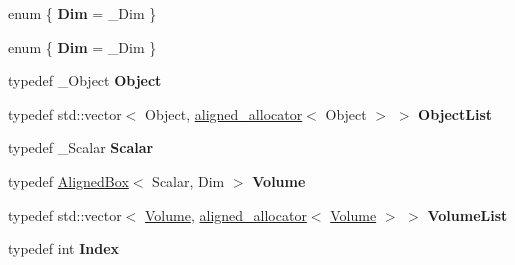 \begin{DoxyCompactItemize}
\item 
\mbox{\label{class_eigen_1_1_kd_b_v_h_a1f3066a8ca1cd3418752529af78ed202}} 
enum \{ {\bfseries Dim} = \+\_\+\+Dim
 \}
\item 
\mbox{\label{class_eigen_1_1_kd_b_v_h_a714c02ec57b42170e025e4790cb52114}} 
enum \{ {\bfseries Dim} = \+\_\+\+Dim
 \}
\item 
\mbox{\label{class_eigen_1_1_kd_b_v_h_a5e7aa76dd924d1769a6553e01ad15465}} 
typedef \+\_\+\+Object {\bfseries Object}
\item 
\mbox{\label{class_eigen_1_1_kd_b_v_h_ae4959ded9043c983256243c96a70729b}} 
typedef std\+::vector$<$ Object, \hyperlink{group___core___module_class_eigen_1_1aligned__allocator}{aligned\+\_\+allocator}$<$ Object $>$ $>$ {\bfseries Object\+List}
\item 
\mbox{\label{class_eigen_1_1_kd_b_v_h_a9d6a9f44ab06e4de7710a16ddbf57d4d}} 
typedef \+\_\+\+Scalar {\bfseries Scalar}
\item 
\mbox{\label{class_eigen_1_1_kd_b_v_h_aa6dc4b3d16e0af79823b21ee3cd53c93}} 
typedef \hyperlink{group___geometry___module_class_eigen_1_1_aligned_box}{Aligned\+Box}$<$ Scalar, Dim $>$ {\bfseries Volume}
\item 
\mbox{\label{class_eigen_1_1_kd_b_v_h_a7dfb6a468c70f7e1a0a4e24303bdfb8a}} 
typedef std\+::vector$<$ \hyperlink{group___geometry___module_class_eigen_1_1_aligned_box}{Volume}, \hyperlink{group___core___module_class_eigen_1_1aligned__allocator}{aligned\+\_\+allocator}$<$ \hyperlink{group___geometry___module_class_eigen_1_1_aligned_box}{Volume} $>$ $>$ {\bfseries Volume\+List}
\item 
\mbox{\label{class_eigen_1_1_kd_b_v_h_ad856a9168aa72e090151bced902c24c6}} 
typedef int {\bfseries Index}
\item 
\mbox{\label{class_eigen_1_1_kd_b_v_h_ad1a43287b2997e922773789788a8fe95}} 

\end{DoxyCompactItemize}
